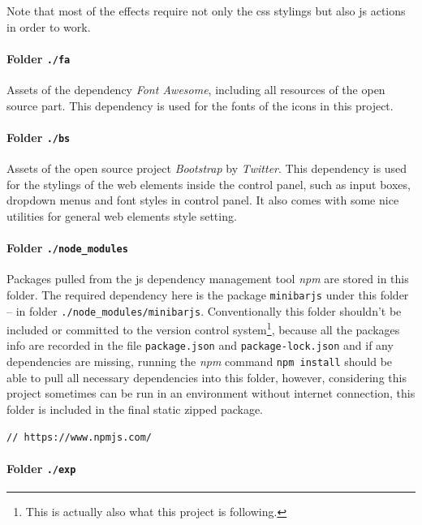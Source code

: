 Note that most of the effects require not only the \gls{css} stylings but also \gls{js} actions in order to work.

\paragraph{Folder \texttt{./fa}}

Assets of the dependency \emph{Font Awesome}, including all resources of the open source part. This dependency is used for the fonts of the icons in this project.

\paragraph{Folder \texttt{./bs}}

Assets of the open source project \emph{Bootstrap} by \emph{Twitter}. This dependency is used for the stylings of the web elements inside the control panel, such as input boxes, dropdown menus and font styles in control panel. It also comes with some nice utilities for general web elements style setting.

\paragraph{Folder \texttt{./node\_modules}}

Packages pulled from the \gls{js} dependency management tool \emph{npm} are stored in this folder. The required dependency here is the package \texttt{minibarjs} under this folder -- in folder \texttt{./node\_modules/minibarjs}. Conventionally this folder shouldn't be included or committed to the version control system\footnote{ This is actually also what this project is following. }, because all the packages info are recorded in the file \texttt{package.json} and \texttt{package-lock.json} and if any dependencies are missing, running the \emph{npm} command \texttt{npm install} should be able to pull all necessary dependencies into this folder, however, considering this project sometimes can be run in an environment without internet connection, this folder is included in the final static zipped package.

\begin{verbatim}
// https://www.npmjs.com/
\end{verbatim}

\paragraph{Folder \texttt{./exp}}

